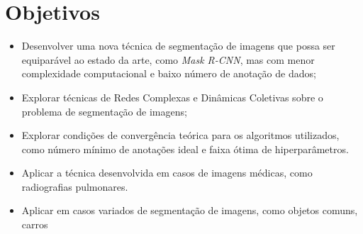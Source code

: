 \chapter{Objetivos}\label{cap:objetivos}

\begin{itemize}
\item Desenvolver uma nova técnica de segmentação de imagens que possa ser
equiparável ao estado da arte, como \textit{Mask R-CNN}, mas com menor
complexidade computacional e baixo número de anotação de dados;
\item Explorar técnicas de Redes Complexas e Dinâmicas Coletivas sobre
  o problema de segmentação de imagens;
\item Explorar condições de convergência teórica para os algoritmos
utilizados, como número mínimo de anotações ideal e faixa ótima de
hiperparâmetros.
\item Aplicar a técnica desenvolvida em casos de imagens médicas, como
  radiografias pulmonares.
\item Aplicar em casos variados de segmentação de imagens, como
  objetos comuns, carros
\end{itemize}
